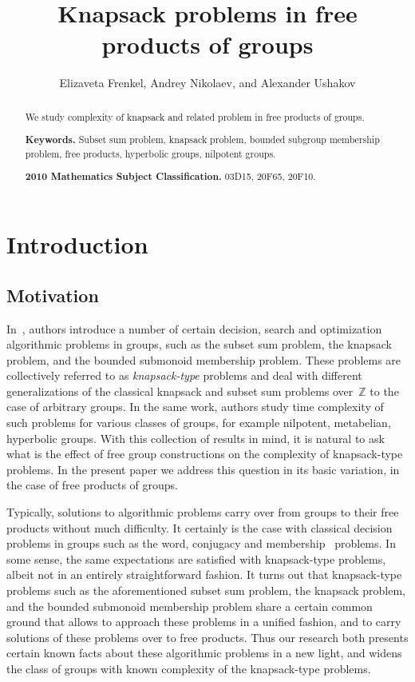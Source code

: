 \documentclass[10pt]{amsart}
\title{Knapsack problems in free products of groups}
\author[]{Elizaveta Frenkel, Andrey Nikolaev, and Alexander Ushakov}
\theoremstyle{definition}
\begin{document}
\begin{abstract}
We study complexity of knapsack and related problem in free products of groups.

\noindent
{\bf Keywords.} Subset sum problem,  knapsack problem, bounded subgroup membership problem, free products, hyperbolic groups, nilpotent groups.

\noindent
{\bf 2010 Mathematics Subject Classification.} 03D15, 20F65, 20F10.
\end{abstract}
\maketitle


\tableofcontents

\section{Introduction}\label{sec:intro}


\subsection{Motivation}\label{sub:motivation}
In~\cite{MNU1}, authors introduce a number of certain decision, search and optimization algorithmic problems in groups, such as the subset sum problem, the knapsack problem, and the bounded submonoid membership problem. These problems are collectively referred to as {\em knapsack-type} problems and deal with different generalizations of the classical knapsack and subset sum problems over~$\mathbb Z$ to the case of arbitrary groups. In the same work, authors study time complexity of such problems for various classes of groups, for example nilpotent, metabelian, hyperbolic groups. With this collection of results in mind, it is natural to ask what is the effect of free group constructions on the complexity of knapsack-type problems. In the present paper we address this question in its basic variation, in the case of free products of groups.

Typically, solutions to algorithmic problems carry over from groups to their free products without much difficulty. It certainly is the case with classical decision problems in groups such as the word, conjugacy and membership~\cite{Mihailova_68} problems. In some sense, the same expectations are satisfied with knapsack-type problems, albeit not in an entirely straightforward fashion. It turns out that knapsack-type problems such as the aforementioned subset sum problem, the knapsack problem, and the bounded submonoid membership problem share a certain common ground that allows to approach these problems in a unified fashion, and to carry solutions of these problems over to free products. Thus our research both presents certain known facts about these algorithmic problems in a new light, and widens the class of groups with known complexity of the knapsack-type problems.
\end{document}
